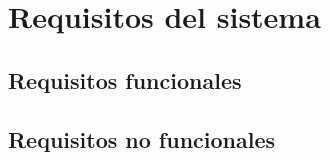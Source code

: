 \section{Requisitos del sistema}
\subsection{Requisitos funcionales}

\subsection{Requisitos no funcionales}